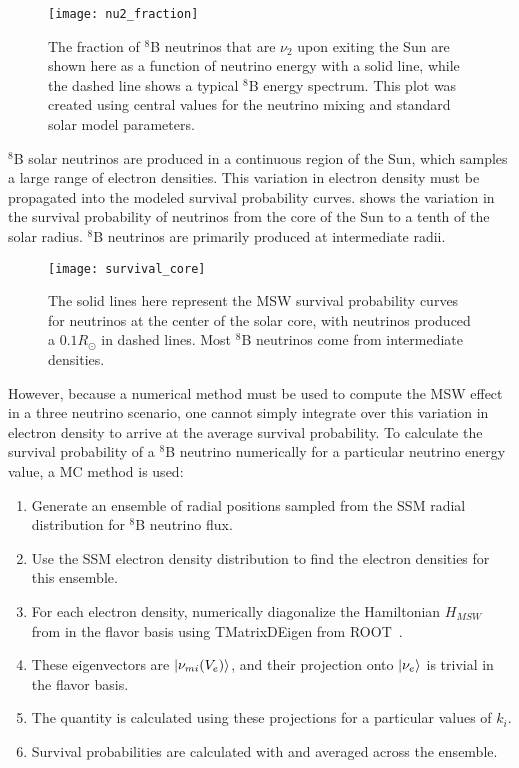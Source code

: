 \begin{figure}
\centering
\texttt{[image: nu2\_fraction]}
\caption{
The fraction of $^8$B neutrinos that are $\nu_2$ upon exiting the Sun are shown here as a function of neutrino energy with a solid line, while the dashed line shows a typical $^8$B energy spectrum. 
This plot was created using central values for the neutrino mixing and standard solar model parameters. 
}
\label{fig:frac_not_nu_2}
\end{figure}

$^8$B solar neutrinos are produced in a continuous region of the Sun, which samples a large range of electron densities.
This variation in electron density must be propagated into the modeled survival probability curves.
 shows the variation in the survival probability of neutrinos from the core of the Sun to a tenth of the solar radius.
$^8$B neutrinos are primarily produced at intermediate radii.

\begin{figure}
\centering
\texttt{[image: survival\_core]}
\caption{The solid lines here represent the MSW survival probability curves for neutrinos at the center of the solar core, with neutrinos produced a $0.1R_{\odot}$ in dashed lines. Most $^8$B neutrinos come from intermediate densities.}
\label{fig:core_density}
\end{figure}

However, because a numerical method must be used to compute the MSW effect in a three neutrino scenario, one cannot simply integrate over this variation in electron density to arrive at the average survival probability. 
To calculate the survival probability of a $^8$B neutrino numerically for a particular neutrino energy value, a MC method is used:
\begin{enumerate}
\item Generate an ensemble of radial positions sampled from the SSM radial distribution for $^8$B neutrino flux.
\item Use the SSM electron density distribution to find the electron densities for this ensemble.
\item For each electron density, numerically diagonalize the Hamiltonian $H_{MSW}$ from  in the flavor basis using TMatrixDEigen from ROOT~\cite{root}.
\item These eigenvectors are  $\ket{\nu_{mi}(V_e)}$, and their projection onto $\ket{\nu_e}$ is trivial in the flavor basis.
\item The quantity  is calculated using these projections for a particular values of $k_i$.
\item Survival probabilities are calculated with  and averaged across the ensemble.
\end{enumerate} 

